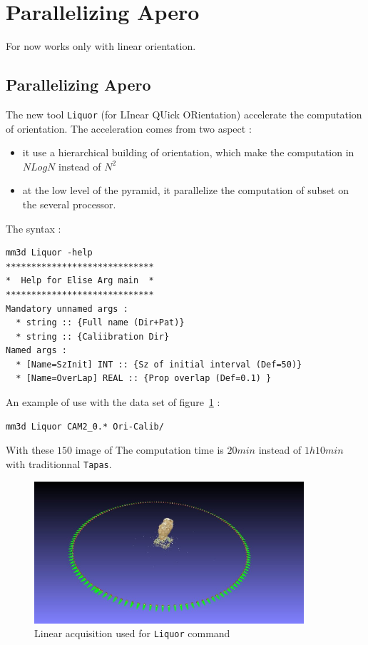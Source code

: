 
\section{Parallelizing Apero}

For now works only with linear orientation.

\subsection{Parallelizing Apero}

The new tool {\tt Liquor} (for LInear QUick ORientation) accelerate the computation of orientation. The acceleration comes
from two aspect : 

\begin{itemize}
   \item  it use a hierarchical building of orientation, which make the computation in $N Log N$ instead of $N^2$
   \item  at the low level of the pyramid, it parallelize the computation of subset on the several processor.
\end{itemize}

The syntax :

\begin{verbatim}
mm3d Liquor -help
*****************************
*  Help for Elise Arg main  *
*****************************
Mandatory unnamed args : 
  * string :: {Full name (Dir+Pat)}
  * string :: {Caliibration Dir}
Named args : 
  * [Name=SzInit] INT :: {Sz of initial interval (Def=50)}
  * [Name=OverLap] REAL :: {Prop overlap (Def=0.1) }
\end{verbatim}

An example of use  with the data set of figure~\ref{FIG:Liquor:DataMap} :

\begin{verbatim}
mm3d Liquor CAM2_0.* Ori-Calib/
\end{verbatim}


With these $150$ image of The computation time is $20 min$ instead of $1h10min$ with traditionnal {\tt Tapas}.

\begin{figure}
\begin{center}
\includegraphics[width=100mm]{FIGS/Ange/LineAcq.jpg}
\end{center}
\caption{Linear acquisition used for {\tt Liquor} command}
\label{FIG:Liquor:DataMap}
\end{figure}


